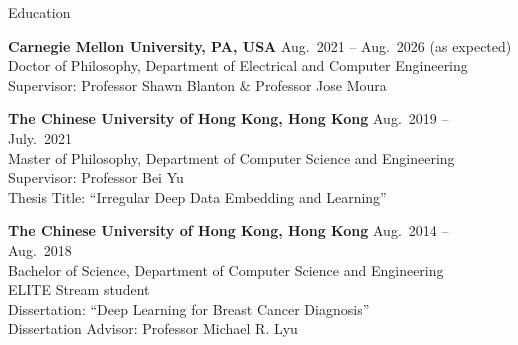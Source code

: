 

\begin{rSection}{Education}

{\bf Carnegie Mellon University, PA, USA} \hfill {Aug.~2021 -- Aug.~2026 (as expected)} \\ 
Doctor of Philosophy, Department of Electrical and Computer Engineering  \\
Supervisor: Professor Shawn Blanton \& Professor Jose Moura 

{\bf The Chinese University of Hong Kong, Hong Kong} \hfill {Aug.~2019 -- July.~2021} \\ 
Master of Philosophy, Department of Computer Science and Engineering \\
Supervisor: Professor Bei Yu \\
Thesis Title: ``Irregular Deep Data Embedding and Learning''

{\bf The Chinese University of Hong Kong, Hong Kong} \hfill {Aug.~2014 -- Aug.~2018} \\ 
Bachelor of Science, Department of Computer Science and Engineering \\
ELITE Stream student \\
Dissertation: ``Deep Learning for Breast Cancer Diagnosis'' \\ 
Dissertation Advisor: Professor Michael R. Lyu
\end{rSection}




